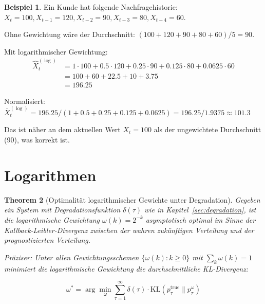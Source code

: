 \documentclass[12pt, a4paper, titlepage]{report}
\newtheorem{theorem}{Theorem}[section]
\theoremstyle{definition}
\newtheorem{example}[theorem]{Beispiel}
\theoremstyle{remark}
\newcommand{\KL}{\mathrm{KL}}
\begin{document}
\begin{example}
Ein Kunde hat folgende Nachfragehistorie: $X_t = 100, X_{t-1} = 120, X_{t-2} = 90, X_{t-3} = 80, X_{t-4} = 60$.

Ohne Gewichtung wäre der Durchschnitt: $(100 + 120 + 90 + 80 + 60)/5 = 90$.

Mit logarithmischer Gewichtung:
\begin{align}
\hat{X}_t^{(\log)} &= 1 \cdot 100 + 0.5 \cdot 120 + 0.25 \cdot 90 + 0.125 \cdot 80 + 0.0625 \cdot 60 \\
&= 100 + 60 + 22.5 + 10 + 3.75 \\
&= 196.25
\end{align}

Normalisiert: $\bar{X}_t^{(\log)} = 196.25 / (1 + 0.5 + 0.25 + 0.125 + 0.0625) = 196.25 / 1.9375 \approx 101.3$

Das ist näher an dem aktuellen Wert $X_t = 100$ als der ungewichtete Durchschnitt (90), was korrekt ist.
\end{example}

\section{Logarithmen}

\begin{theorem}[Optimalität logarithmischer Gewichte unter Degradation]
\label{thm:log_optimal}
Gegeben ein System mit Degradationsfunktion $\delta(\tau)$ wie in Kapitel~\ref{sec:degradation}, ist die logarithmische Gewichtung $\omega(k) = 2^{-k}$ asymptotisch optimal im Sinne der Kullback-Leibler-Divergenz zwischen der wahren zukünftigen Verteilung und der prognostizierten Verteilung.

Präziser: Unter allen Gewichtungsschemen $\{\omega(k) : k \geq 0\}$ mit $\sum_k \omega(k) = 1$ minimiert die logarithmische Gewichtung die durchschnittliche KL-Divergenz:

\begin{equation}
\omega^* = \arg\min_{\omega} \sum_{\tau=1}^{\infty} \delta(\tau) \cdot \KL(p_\tau^{\text{true}} \parallel p_\tau^{\omega})
\label{eq:optimal_weighting}
\end{equation}
\end{theorem}
\end{document}
